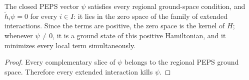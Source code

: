 \begin{theorem}%
    \label{thm:peps_region_parent_frustration_free}
    \leanok
    The closed PEPS vector $\psi$ satisfies every regional ground-space
    condition, and $\widetilde h_i\psi=0$ for every $i\in I$: it lies in the
    zero space of the family of extended interactions. Since the terms are
    positive, the zero space is the kernel of $H$; whenever $\psi\ne0$, it
    is a ground state of this positive Hamiltonian, and it minimizes every
    local term simultaneously.
\end{theorem}

\begin{proof}\leanok
    Every complementary slice of $\psi$ belongs to the regional
    PEPS ground space. Therefore every extended interaction kills
    $\psi$.
\end{proof}
